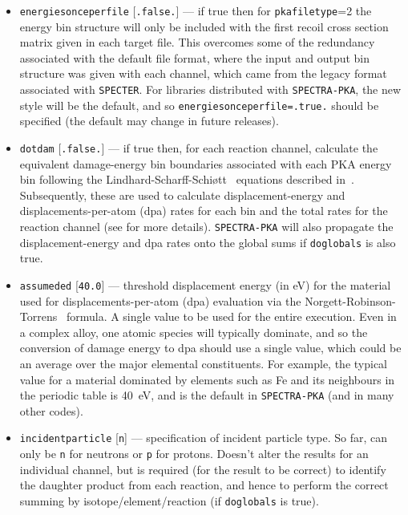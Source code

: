 \documentclass[a4paper]{article}
\begin{document}
\begin{itemize}
\item \texttt{energies{\textunderscore}once{\textunderscore}perfile} [\texttt{.false.}] --- if true then for   \texttt{pka{\textunderscore}filetype}=2 the energy bin structure will only be included with the first recoil cross section matrix given in each target file. This overcomes some of the redundancy associated with the default file format, where the input and output bin structure was given with each channel, which came from the legacy format associated with \texttt{SPECTER}. For libraries distributed with \texttt{SPECTRA-PKA}, the new style will be the default, and so \texttt{energies{\textunderscore}once{\textunderscore}perfile=.true.} should be specified (the default may change in future releases).
\item \texttt{do{\textunderscore}tdam} [\texttt{.false.}] --- if true then, for each reaction channel, calculate the equivalent damage-energy bin boundaries associated with each PKA energy bin following the Lindhard-Scharff-Schi{\o}tt~\cite{lindardetal1963a} equations described in~\cite{robinson1994,gilbertsublet2018}. Subsequently, these are used to calculate displacement-energy and displacements-per-atom (dpa) rates for each bin and the total rates for the reaction channel (see \cite{gilbertsublet2018} for more details). \texttt{SPECTRA-PKA} will also propagate the displacement-energy and dpa rates onto the global sums if \texttt{do{\textunderscore}globals} is also true.
\item \texttt{assumed{\textunderscore}ed} [\texttt{40.0}] --- threshold displacement energy (in eV) for the material used for displacements-per-atom (dpa) evaluation via the Norgett-Robinson-Torrens~\cite{norgettetal1975} formula. A single value to be used for the entire execution. Even in a complex alloy, one atomic species will typically dominate, and so the conversion of damage energy to dpa should use a single value, which could be an average over the major elemental constituents. For example, the typical value for a material dominated by elements such as Fe and its neighbours in the periodic table is 40~eV, and is the default in \texttt{SPECTRA-PKA} (and in many other codes).
\item \texttt{incident{\textunderscore}particle} [\texttt{n}] --- specification of incident particle type. So far, can only be \texttt{n} for neutrons or \texttt{p} for protons. Doesn't alter the results for an individual channel, but is required (for the result to be correct) to identify the daughter product from each reaction, and hence to perform the correct summing by isotope/element/reaction (if \texttt{do{\textunderscore}globals} is true).

\end{itemize}
\end{document}
